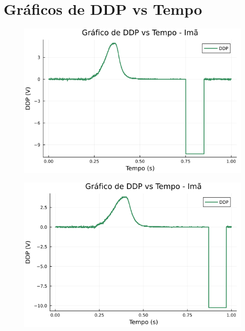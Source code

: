 \section*{Gráficos de DDP vs Tempo}
\begin{center}
\begin{multicols}{2}

\begin{figure}[H]
    \centering
    \includegraphics[width=1.0\linewidth]{figuras/grafico_dados1_F0002CH1.png}
\end{figure}

\begin{figure}[H]
    \centering
    \includegraphics[width=1.0\linewidth]{figuras/grafico_dados1_F0003CH1.png}
\end{figure}


\end{multicols}
\end{center}
